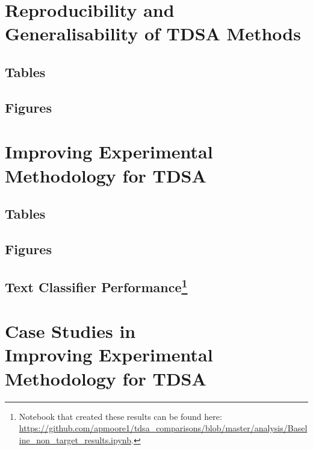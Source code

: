 \documentclass[twoside,11pt, a4paper]{report}
\begin{document}
\FloatBarrier
\begin{appendices}
  \FloatBarrier
  \chapter{Reproducibility and Generalisability of TDSA Methods}
  \FloatBarrier
  \section{Tables}
  \label{appendix_reproducibility_tables}
  
  \FloatBarrier
  \section{Figures}
  \label{appendix_reproducibility_images}
  
  \FloatBarrier
  \chapter[Improving Experimental Methodology for TDSA]{Improving Experimental\\Methodology for TDSA}
  \FloatBarrier
  \section{Tables}
  \label{appendix_augmentation_tables}
  
  \FloatBarrier
  \section{Figures}
  \label{appendix_augmentation_figures}
  
  \FloatBarrier
  \section[Text Classifier Performance]{Text Classifier Performance\footnote{Notebook that created these results can be found here: \url{https://github.com/apmoore1/tdsa_comparisons/blob/master/analysis/Baseline_non_target_results.ipynb}.}}
  \label{section:appendix_cnn_tdsa_baseline}
  
  \FloatBarrier
  \chapter[Case Studies in Improving Experimental Methodology for TDSA]{Case Studies in\\Improving Experimental\\Methodology for TDSA}
  \FloatBarrier

\end{appendices}
\end{document}
